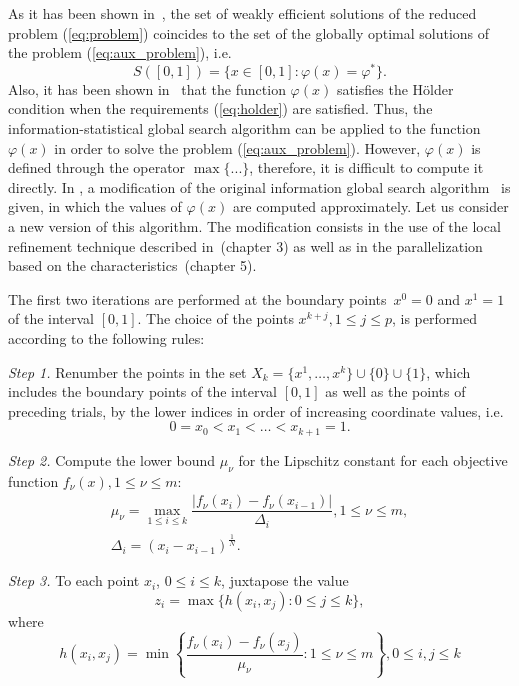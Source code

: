 \documentclass{llncs}
\begin{document}
As it has been shown in~\cite{markinStrongin1993}, the set of weakly efficient solutions of the
reduced problem (\ref{eq:problem}) coincides to the set of the globally optimal solutions of
the problem (\ref{eq:aux_problem}), i.e.
\begin{equation}
  \label{eq:s}
  S([0,1])=\{x\in [0,1]:\varphi(x)=\varphi^*\}.
\end{equation}
Also, it has been shown in~\cite{markinStrongin1993} that the function \(\varphi(x)\) satisfies
the H\"older condition when the requirements (\ref{eq:holder}) are satisfied. Thus, the
information-statistical global search algorithm can be applied to the function \(\varphi(x)\) in
order to solve the problem (\ref{eq:aux_problem}). However, \(\varphi(x)\) is defined through
the operator \(\max\{...\}\), therefore, it is difficult to compute it directly. In
\cite{markinStrongin1993}, a modification of the original information
global search algorithm~\cite{mixedAlg} is given, in which the values of \(\varphi(x)\) are computed
approximately. Let us consider a new version of this algorithm. The modification
consists in the use of the local refinement technique described in~\cite{strOptBook}(chapter 3)
as well as in the parallelization based on the characteristics~\cite{strOptBook}(chapter 5).

The first two iterations are performed at the boundary points~\(x^0=0\) and \(x^1=1\) of the
interval \([0,1]\). The choice of the points \(x^{k+j}, 1\leqslant j\leqslant p\), is performed
according to the following rules:

\textit{Step 1.} Renumber the points in the set \(X_k=\{x^1,\dotsc,x^k\}\cup\{0\}\cup\{1\}\),
which includes the boundary points of the interval \([0,1]\) as well as the points of preceding
trials, by the lower indices in order of increasing coordinate values, i.e.
\begin{displaymath}
  0=x_0<x_1<\dotsc<x_{k+1}=1.
\end{displaymath}

\textit{Step 2.} Compute the lower bound \(\mu_\nu\) for the Lipschitz constant for each
objective function \(f_\nu(x),1\leqslant\nu\leqslant m\):
\begin{gather}
\label{eq:step2_1}
\mu_\nu=\max_{1\leqslant i\leqslant k}\dfrac{|f_\nu(x_i)-f_\nu(x_{i-1})|}{\Delta_i}, 1\leqslant
\nu\leqslant m, \\
\label{eq:step2_2}
\Delta_i=(x_i-x_{i-1})^\frac{1}{N}.
\end{gather}

\textit{Step 3.} To each point \(x_i\), \(0\leqslant i\leqslant k\), juxtapose the value
\begin{equation}
  z_i=\max\{h(x_i,x_j):0\leqslant j\leqslant k\},
\end{equation}
where
\begin{equation}
  h(x_i,x_j)=\min \left\{ \frac{f_\nu(x_i)-f_\nu(x_j)}{\mu_\nu}:1\leqslant \nu\leqslant m \right\}, 0\leqslant
i,j\leqslant k
\end{equation}
\end{document}
